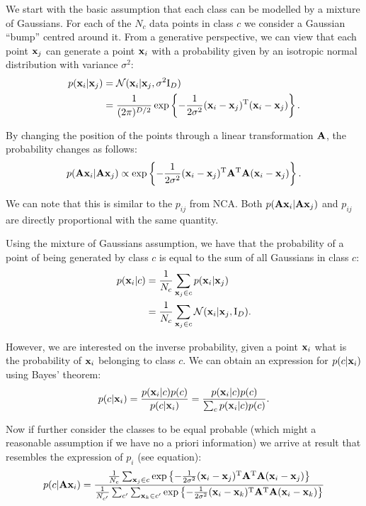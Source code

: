 	We start with the basic assumption that each class can be modelled by a mixture
	of Gaussians. For each of the $N_c$ data points in class $c$ we consider a
	Gaussian ``bump'' centred around it. From a generative perspective, we can view
	that each point $\mathbf{x}_j$ can generate a point $\mathbf{x}_i$ with a probability given by
	an isotropic normal distribution with variance $\sigma^2$:
	\begin{align}
	    p(\mathbf{x}_i|\mathbf{x}_j) &= \mathcal{N}(\mathbf{x}_i|\mathbf{x}_j, \sigma^2\mathrm{I}_D) \\
	                   &= \frac{1}{(2\pi)^{D/2}}\exp \left\{-\frac{1}{2\sigma^2}
	(\mathbf{x}_i - \mathbf{x}_j)^\mathrm{T}(\mathbf{x}_i - \mathbf{x}_j)\right\}.
	\end{align}
	
	By changing the position of the points through a linear transformation $\mathbf{A}$,
	the probability changes as follows:
	\begin{align}
	    p(\mathbf{A}\mathbf{x}_i|\mathbf{A}\mathbf{x}_j) \propto \exp \left\{-\frac{1}{2\sigma^2} (\mathbf{x}_i -
	\mathbf{x}_j)^\mathrm{T}\mathbf{A}^\mathrm{T}\mathbf{A}(\mathbf{x}_i - \mathbf{x}_j)\right\}.
	\end{align}
	
	We can note that this is similar to the $p_{ij}$ from NCA. Both
	$p(\mathbf{A}\mathbf{x}_i|\mathbf{A}\mathbf{x}_j)$ and $p_{ij}$ are directly proportional with the same
	quantity.
	
	Using the mixture of Gaussians assumption, we have that the probability of a
	point of being generated by class $c$ is equal to the sum of all Gaussians in
	class $c$:
	\begin{align}
	    p(\mathbf{x}_i|c) &= \frac{1}{N_c}\sum_{\mathbf{x}_j \in c} p(\mathbf{x}_i|\mathbf{x}_j)\\
	               &= \frac{1}{N_c}\sum_{\mathbf{x}_j \in c} \mathcal{N}(\mathbf{x}_i|\mathbf{x}_j,
	\mathrm{I}_D).
	\end{align}
	
	However, we are interested on the inverse probability, given a point $\mathbf{x}_i$
	what is the probability of $\mathbf{x}_i$ belonging to class $c$. We can obtain an
	expression for $p(c|\mathbf{x}_i)$ using Bayes' theorem:
	\begin{align}
	    p(c|\mathbf{x}_i) = \frac{p(\mathbf{x}_i|c)p(c)}{p(c|\mathbf{x}_i)} =
	\frac{p(\mathbf{x}_i|c)p(c)}{\sum_{c} p(\mathbf{x}_i|c)p(c)}.
	    \label{eq:nca-cc-kde-bayes}
	\end{align}
	
	Now if further consider the classes to be equal probable (which might a
	reasonable assumption if we have no a priori information) we arrive at result
	that resembles the expression of $p_i$ (see equation):
	\begin{align}
	    p(c|\mathbf{A}\mathbf{x}_i) = \frac{
	                \frac{1}{N_c}\sum_{\mathbf{x}_j \in
	c}\exp\left\{-\frac{1}{2\sigma^2}(\mathbf{x}_i -
	\mathbf{x}_j)^\mathrm{T}\mathbf{A}^\mathrm{T}\mathbf{A}(\mathbf{x}_i - \mathbf{x}_j)\right\}
	                }
	                {
	                \frac{1}{N_{c'}}\sum_{c'} \sum_{\mathbf{x}_k \in
	c'}\exp\left\{-\frac{1}{2\sigma^2}(\mathbf{x}_i -
	\mathbf{x}_k)^\mathrm{T}\mathbf{A}^\mathrm{T}\mathbf{A}(\mathbf{x}_i - \mathbf{x}_k)\right\}
	                }
	\end{align}
	
